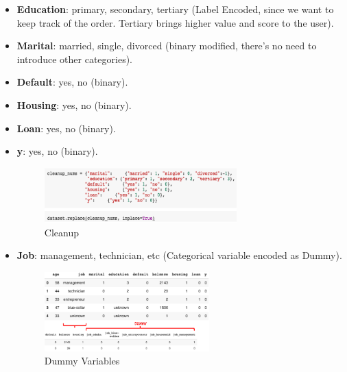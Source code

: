 \begin{itemize}[noitemsep]
\item \textbf{Education}: primary, secondary, tertiary (Label Encoded, since we want to keep track of the order. Tertiary brings higher value and score to the user).
\item \textbf{Marital}: married, single, divorced (binary modified, there's no need to introduce other categories).
\item \textbf{Default}: yes, no (binary).
\item \textbf{Housing}: yes, no (binary).
\item \textbf{Loan}: yes, no (binary).
\item \textbf{y}: yes, no (binary).

\begin{figure}[H]
\centering
\includegraphics[width=0.7\textwidth]{Img/clean_up.png}
\caption{Cleanup}
\end{figure}
\item \textbf{Job}:  management, technician, etc (Categorical variable encoded as Dummy).
\begin{figure}[H]
\centering
\includegraphics[width=0.6\textwidth]{Img/dummy.png}
\caption{Dummy Variables}
\end{figure}
\end{itemize}

